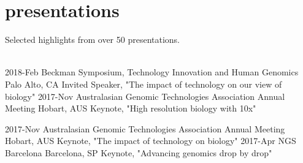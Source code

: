 \documentclass[]{dmc-cv} %
\begin{document}
\section{presentations}
Selected highlights from over 50 presentations.\\
\\
\begin{entrylist}
\entry
{2018-Feb}
{Beckman Symposium, Technology Innovation and Human Genomics}
{Palo Alto, CA}
{Invited Speaker, "The impact of technology on our view of biology"}
\entry
{2017-Nov}
{Australasian Genomic Technologies Association Annual Meeting}
{Hobart, AUS}
{Keynote, "High resolution biology with 10x"}
\end{entrylist}
\begin{entrylist}
\entry
{2017-Nov}
{Australasian Genomic Technologies Association Annual Meeting}
{Hobart, AUS}
{Keynote, "The impact of technology on biology"}
\entry
{2017-Apr}
{NGS Barcelona}
{Barcelona, SP}
{Keynote, "Advancing genomics drop by drop"}


\end{entrylist}
\end{document}
